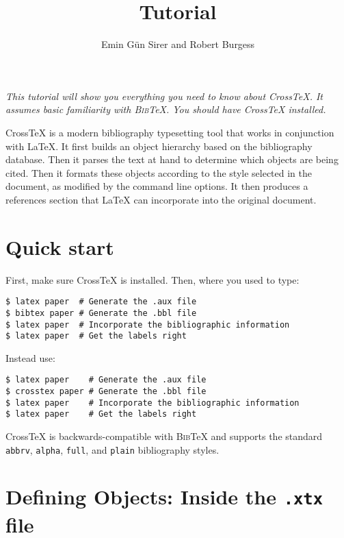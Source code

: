 \documentclass{article}
\title{\XTeX{} Tutorial}
\author{Emin G\"un Sirer and Robert Burgess}
\date{}
\newcommand{\XTeX}{Cross\TeX}
\newcommand{\BibTeX}{\textsc{Bib}\TeX}
\begin{document}
\maketitle

\textit{
This tutorial will show you everything you need to know about \XTeX{}. It assumes basic familiarity with \BibTeX{}. You should have \XTeX{} installed.
}

\XTeX{} is a modern bibliography typesetting tool that works in conjunction with \LaTeX{}. It first builds an object hierarchy based on the bibliography database. Then it parses the text at hand to determine which objects are being cited. Then it formats these objects according to the style selected in the document, as modified by the command line options. It then produces a references section that \LaTeX{} can incorporate into the original document.



\section{Quick start}

First, make sure \XTeX{} is installed. Then, where you used to type:

\begin{small}\begin{verbatim}
$ latex paper  # Generate the .aux file
$ bibtex paper # Generate the .bbl file
$ latex paper  # Incorporate the bibliographic information
$ latex paper  # Get the labels right
\end{verbatim}\end{small}

Instead use:

\begin{small}\begin{verbatim}
$ latex paper    # Generate the .aux file
$ crosstex paper # Generate the .bbl file
$ latex paper    # Incorporate the bibliographic information
$ latex paper    # Get the labels right
\end{verbatim}\end{small}

\XTeX{} is backwards-compatible with \BibTeX{} and supports the standard \texttt{abbrv}, \texttt{alpha}, \texttt{full}, and \texttt{plain} bibliography styles.

\section{Defining Objects: Inside the \texttt{.xtx} file}
\end{document}
